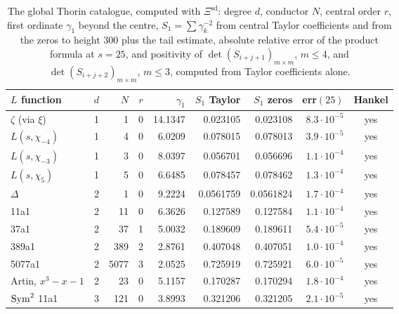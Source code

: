 \begin{table}[t]
\centering
\footnotesize
\setlength{\tabcolsep}{3.2pt}
\begin{tabular}{lrrrrrrrc}
\toprule
$L$ function & $d$ & $N$ & $r$ & $\gamma_1$ & $S_1$ Taylor & $S_1$ zeros & err$(25)$ & Hankel\\
\midrule
$\zeta$ (via $\xi$) & 1 & 1 & 0 & 14.1347 & 0.023105 & 0.023108 & $8.3\cdot10^{-5}$ & yes\\
$L(s,\chi_{-4})$ & 1 & 4 & 0 & 6.0209 & 0.078015 & 0.078013 & $3.9\cdot10^{-5}$ & yes\\
$L(s,\chi_{-3})$ & 1 & 3 & 0 & 8.0397 & 0.056701 & 0.056696 & $1.1\cdot10^{-4}$ & yes\\
$L(s,\chi_5)$ & 1 & 5 & 0 & 6.6485 & 0.078457 & 0.078462 & $1.3\cdot10^{-4}$ & yes\\
$\Delta$ & 2 & 1 & 0 & 9.2224 & 0.0561759 & 0.0561824 & $1.7\cdot10^{-4}$ & yes\\
11a1 & 2 & 11 & 0 & 6.3626 & 0.127589 & 0.127584 & $1.1\cdot10^{-4}$ & yes\\
37a1 & 2 & 37 & 1 & 5.0032 & 0.189609 & 0.189611 & $5.4\cdot10^{-5}$ & yes\\
389a1 & 2 & 389 & 2 & 2.8761 & 0.407048 & 0.407051 & $1.0\cdot10^{-4}$ & yes\\
5077a1 & 2 & 5077 & 3 & 2.0525 & 0.725919 & 0.725921 & $6.0\cdot10^{-5}$ & yes\\
Artin, $x^3-x-1$ & 2 & 23 & 0 & 5.1157 & 0.170287 & 0.170294 & $1.8\cdot10^{-4}$ & yes\\
$\operatorname{Sym}^2$ 11a1 & 3 & 121 & 0 & 3.8993 & 0.321206 & 0.321205 & $2.1\cdot10^{-5}$ & yes\\
\bottomrule
\end{tabular}
\caption{The global Thorin catalogue, computed with $\Xi^{\mathrm{sd}}$: degree $d$, conductor $N$, central order $r$, first ordinate $\gamma_1$ beyond the centre, $S_1 = \sum\gamma_k^{-2}$ from central Taylor coefficients and from the zeros to height $300$ plus the tail estimate, absolute relative error of the product formula at $s=25$, and positivity of $\det(S_{i+j+1})_{m\times m}$, $m\le4$, and $\det(S_{i+j+2})_{m\times m}$, $m\le3$, computed from Taylor coefficients alone.}\label{tab:10bcatalogue}
\end{table}

